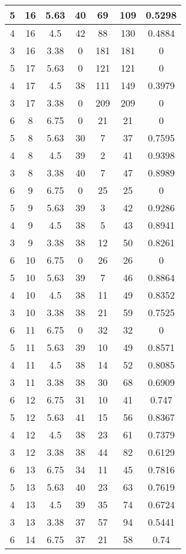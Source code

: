 \documentclass[letterpaper, 12pt]{article}
\begin{document}
\begin{longtable}{|c|c|c|c|c|c|c|}
\hline
5 & 16 & 5.63 & 40 & 69 & 109 & 0.5298 \\
\hline
4 & 16 & 4.5 & 42 & 88 & 130 & 0.4884 \\
\hline
3 & 16 & 3.38 & 0 & 181 & 181 & 0 \\
\hline
5 & 17 & 5.63 & 0 & 121 & 121 & 0 \\
\hline
4 & 17 & 4.5 & 38 & 111 & 149 & 0.3979 \\
\hline
3 & 17 & 3.38 & 0 & 209 & 209 & 0 \\
\hline
6 & 8 & 6.75 & 0 & 21 & 21 & 0 \\
\hline
5 & 8 & 5.63 & 30 & 7 & 37 & 0.7595 \\
\hline
4 & 8 & 4.5 & 39 & 2 & 41 & 0.9398 \\
\hline
3 & 8 & 3.38 & 40 & 7 & 47 & 0.8989 \\
\hline
6 & 9 & 6.75 & 0 & 25 & 25 & 0 \\
\hline
5 & 9 & 5.63 & 39 & 3 & 42 & 0.9286 \\
\hline
4 & 9 & 4.5 & 38 & 5 & 43 & 0.8941 \\
\hline
3 & 9 & 3.38 & 38 & 12 & 50 & 0.8261 \\
\hline
6 & 10 & 6.75 & 0 & 26 & 26 & 0 \\
\hline
5 & 10 & 5.63 & 39 & 7 & 46 & 0.8864 \\
\hline
4 & 10 & 4.5 & 38 & 11 & 49 & 0.8352 \\
\hline
3 & 10 & 3.38 & 38 & 21 & 59 & 0.7525 \\
\hline
6 & 11 & 6.75 & 0 & 32 & 32 & 0 \\
\hline
5 & 11 & 5.63 & 39 & 10 & 49 & 0.8571 \\
\hline
4 & 11 & 4.5 & 38 & 14 & 52 & 0.8085 \\
\hline
3 & 11 & 3.38 & 38 & 30 & 68 & 0.6909 \\
\hline
6 & 12 & 6.75 & 31 & 10 & 41 & 0.747 \\
\hline
5 & 12 & 5.63 & 41 & 15 & 56 & 0.8367 \\
\hline
4 & 12 & 4.5 & 38 & 23 & 61 & 0.7379 \\
\hline
3 & 12 & 3.38 & 38 & 44 & 82 & 0.6129 \\
\hline
6 & 13 & 6.75 & 34 & 11 & 45 & 0.7816 \\
\hline
5 & 13 & 5.63 & 40 & 23 & 63 & 0.7619 \\
\hline
4 & 13 & 4.5 & 39 & 35 & 74 & 0.6724 \\
\hline
3 & 13 & 3.38 & 37 & 57 & 94 & 0.5441 \\
\hline
6 & 14 & 6.75 & 37 & 21 & 58 & 0.74 \\

\end{longtable}
\end{document}
